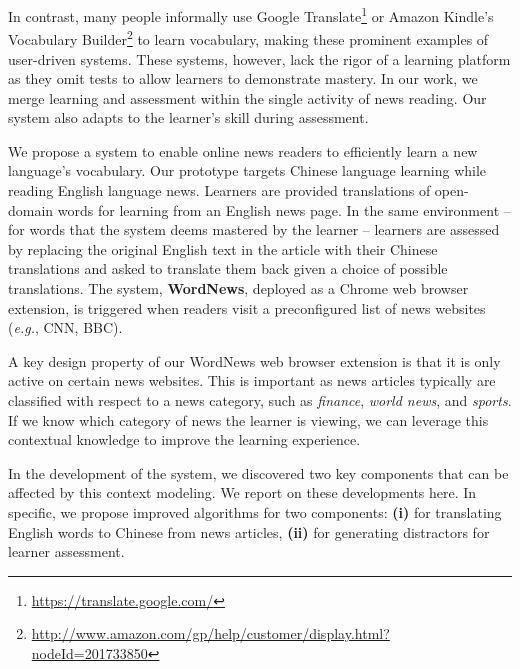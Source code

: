 In contrast, many people informally use Google
Translate\footnote{\url{https://translate.google.com/}} or Amazon Kindle's Vocabulary Builder\footnote{\url{http://www.amazon.com/gp/help/customer/display.html?nodeId=201733850}} to learn
vocabulary, making these prominent examples of user-driven systems.
These systems, however, lack the rigor of a learning platform as they omit
tests to allow learners to demonstrate mastery.  In our work, we merge
learning and assessment within the single activity of news reading.
Our system also adapts to the learner's skill during assessment.

We propose a system to enable online news readers to efficiently learn
a new language's vocabulary. Our prototype targets Chinese language
learning while reading English language news. Learners are provided
translations of open-domain words for learning from an English news
page. In the same environment -- for words that the system deems
mastered by the learner -- learners are assessed by replacing the
original English text in the article with their Chinese translations
and asked to translate them back given a choice of possible
translations.  The system, {\bf WordNews}, deployed as a Chrome web
browser extension, is triggered when readers visit a preconfigured
list of news websites ({\it e.g.}, CNN, BBC).

A key design property of our WordNews web browser extension is that it
is only active on certain news websites.  This is important as news
articles typically are classified with respect to a news category,
such as {\it finance}, {\it world news}, and {\it sports}. If we know
which category of news the learner is viewing, we can leverage this
contextual knowledge to improve the learning experience.

In the development of the system, we discovered two key components
that can be affected by this context modeling.  We report on these
developments here. In specific, we propose improved algorithms for
two components: \textbf{(i)} for translating English words to Chinese
from news articles, \textbf{(ii)} for generating distractors 
for learner assessment.

